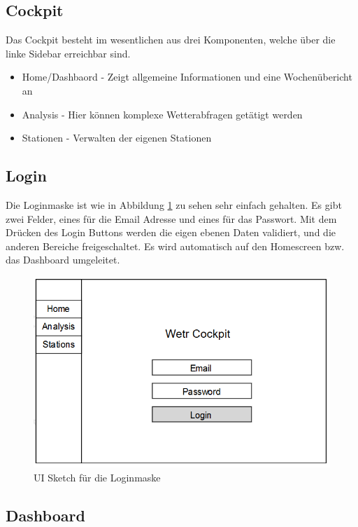 \newpage

\subsection{Cockpit}

Das Cockpit besteht im wesentlichen aus drei Komponenten, welche über die linke Sidebar erreichbar sind.
\begin{itemize}
    \item Home/Dashbaord - Zeigt allgemeine Informationen und eine Wochenübericht an
    \item Analysis - Hier können komplexe Wetterabfragen getätigt werden
    \item Stationen - Verwalten der eigenen Stationen
\end{itemize}

\subsection{Login}

Die Loginmaske ist wie in Abbildung \ref{fig:cock_login} zu sehen sehr einfach gehalten. Es gibt zwei Felder, eines für die Email Adresse und eines für das Passwort. Mit dem Drücken des Login Buttons werden die eigen ebenen Daten validiert, und die anderen Bereiche freigeschaltet. Es wird automatisch auf den Homescreen bzw. das Dashboard umgeleitet.

\begin{figure}[H]
\centering
\includegraphics[width=1\textwidth]{pictures/sketches/cockpit/cockpit_login.png}
\caption{UI Sketch für die Loginmaske}
\label{fig:cock_login}
\end{figure}
\raggedright
\newpage
\subsection{Dashboard}

